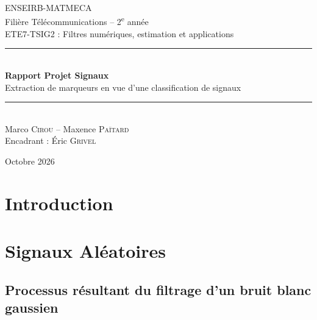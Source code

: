 \documentclass[11pt,a4paper]{article}
\begin{document}
\begin{titlepage}
  \centering
  {\large ENSEIRB-MATMECA}\\[0.2cm]
  {\large Filière Télécommunications -- 2\textsuperscript{e} année}\\[0.2cm]
  {\large ETE7-TSIG2 : Filtres numériques, estimation et applications}\\[3cm]

  \rule{\linewidth}{0.5pt}\\[0.4cm]
  {\LARGE\bfseries Rapport Projet Signaux}\\[0.3cm]
  {\large Extraction de marqueurs en vue d'une classification de signaux}\\
  \rule{\linewidth}{0.5pt}\\[3cm]

  {\large Marco \textsc{Cirou} \quad -- \quad Maxence \textsc{Païtard}}\\[1cm]
  {\large Encadrant : Éric \textsc{Grivel}}

  \vfill
  {\large Octobre 2026}
\end{titlepage}

\tableofcontents
\newpage

\section{Introduction}

\section{Signaux Aléatoires}
\subsection{Processus résultant du filtrage d'un bruit blanc gaussien}
\end{document}
